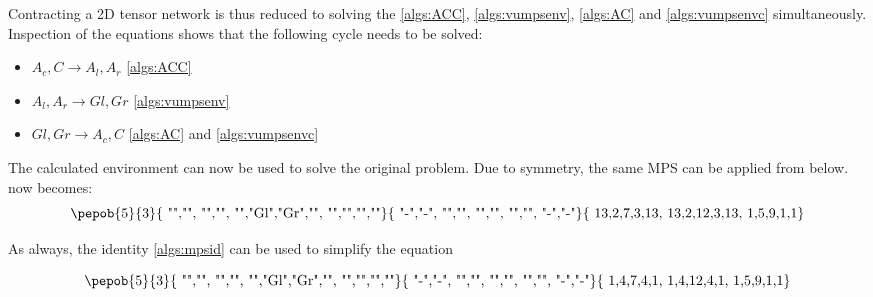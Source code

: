 Contracting a 2D tensor network is thus reduced to solving the  \cref{algs:ACC}, \cref{algs:vumpsenv}, \cref{algs:AC} and \cref{algs:vumpsenvc} simultaneously. Inspection of the equations shows that the following cycle needs to be solved:

\begin{itemize}
    \item  $A_c,C  \rightarrow A_l,A_r  $  \cref{algs:ACC}
    \item  $A_l,A_r  \rightarrow Gl,Gr  $ \cref{algs:vumpsenv}
    \item  $ Gl,Gr   \rightarrow A_c,C $ \cref{algs:AC} and  \cref{algs:vumpsenvc}
\end{itemize}

The calculated environment can now be used to solve the original problem. Due to symmetry, the same MPS can be applied from below.  now becomes:
\begin{equation}\label{vumps_Below}
    \vcenter{ \hbox{   \pepob{5}{3}{{
                        "","", "","",
                        "","Gl","Gr","",
                        "","","",""}}{{
                        "-","-",
                        "","",
                        "","",
                        "","",
                        "-","-"}}{{
                        13,2,7,3,13,
                        13,2,12,3,13,
                        1,5,9,1,1}} }}
\end{equation}

As always, the identity \eqref{algs:mpsid} can be used to simplify the equation

\begin{equation}
    \vcenter{ \hbox{   \pepob{5}{3}{{
                        "","", "","",
                        "","Gl","Gr","",
                        "","","",""}}{{
                        "-","-",
                        "","",
                        "","",
                        "","",
                        "-","-"}}{{
                        1,4,7,4,1,
                        1,4,12,4,1,
                        1,5,9,1,1}} }}
\end{equation}

